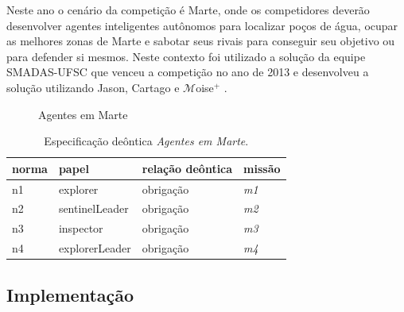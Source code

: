 Neste ano o cenário da competição é Marte, onde os competidores deverão desenvolver agentes inteligentes autônomos para localizar poços de água, ocupar
as melhores zonas de Marte e sabotar seus rivais para conseguir seu objetivo ou para defender si mesmos. Neste contexto foi utilizado a solução da equipe SMADAS-UFSC que venceu a competição no ano de 2013 e desenvolveu a solução utilizando Jason, Cartago e $\mathcal{M}$oise$^{+}$ \cite{zatelli2013smadas, ahlbrecht2013multi}.

\begin{figure}[ht]
  \centering
  \caption{Agentes em Marte}
  \label{fig:marte}
\end{figure}


\begin{table}[ht]
\centering
\caption{Especificação deôntica \textit{Agentes em Marte}. \cite{zatelli2013smadas}}
\label{tab:marte-deontica}
\begin{tabular}{@{}llll@{}}
\toprule
norma   & papel         & relação deôntica  & missão                    \\ \midrule
n1      & explorer          & obrigação         & \textit{m1}               \\
n2      & sentinelLeader    & obrigação         & \textit{m2}               \\
n3      & inspector         & obrigação         & \textit{m3}               \\
n4      & explorerLeader    & obrigação         & \textit{m4}               \\
\bottomrule
\end{tabular}
\end{table}
  
\subsection{Implementação}

